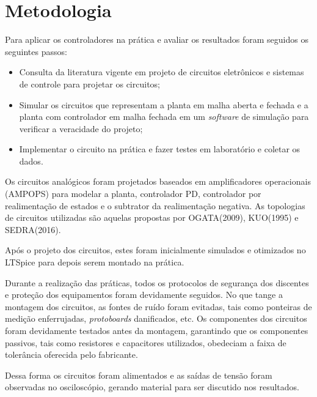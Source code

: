 \section{Metodologia}

Para aplicar os controladores na prática e avaliar os resultados foram seguidos os seguintes passos:

\begin{itemize}
    \item Consulta da literatura vigente em projeto de circuitos eletrônicos e sistemas de controle para projetar os circuitos;
    \item Simular os circuitos que representam a planta em malha aberta e fechada e a planta com controlador em malha fechada em um \textit{software} de simulação para verificar a veracidade do projeto;
    \item Implementar o circuito na prática e fazer testes em laboratório e coletar os dados.
\end{itemize}

Os circuitos analógicos foram projetados baseados em amplificadores operacionais (AMPOPS) para modelar a planta, controlador PD, controlador por realimentação de estados e o subtrator da realimentação negativa. As topologias de circuitos utilizadas são aquelas propostas por OGATA(2009), KUO(1995) e SEDRA(2016).

Após o projeto dos circuitos, estes foram inicialmente simulados e otimizados no LTSpice para depois serem montado na prática.

Durante a realização das práticas, todos os protocolos de segurança dos discentes e proteção dos equipamentos foram devidamente seguidos. No que tange a montagem dos circuitos, as fontes de ruído foram evitadas, tais como ponteiras de medição enferrujadas, \textit{protoboards} danificados, etc. Os componentes dos circuitos foram devidamente testados antes da montagem, garantindo que os componentes passivos, tais como resistores e capacitores utilizados, obedeciam a faixa de tolerância oferecida pelo fabricante.

Dessa forma os circuitos foram alimentados e as saídas de tensão foram observadas no osciloscópio, gerando material para ser discutido nos resultados.

\pagebreak
